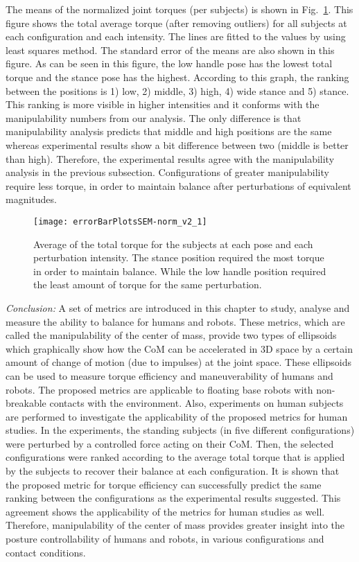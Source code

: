 The means of the normalized joint torques (per subjects) is shown in Fig.~\ref{jointtorque}. This figure shows the total average torque (after removing outliers) for all subjects at each configuration and each intensity. The lines are fitted to the values by using least squares method. The standard error of the means are also shown in this figure. As can be seen in this figure, the low handle pose has the lowest total torque and the stance pose has the highest. According to this graph, the ranking between the positions is 1) low, 2) middle, 3) high, 4) wide stance and 5) stance. This ranking is more visible in higher intensities and it conforms with the manipulability numbers from our analysis. The only difference is that manipulability analysis predicts that middle and high positions are the same whereas experimental results show a bit difference between two (middle is better than high). Therefore, the experimental results agree with the manipulability analysis in the previous subsection. Configurations of greater manipulability require less torque, in order to maintain balance after perturbations of equivalent magnitudes.
\begin{figure}
	\centering \texttt{[image: errorBarPlotsSEM-norm\_v2\_1]}
	\caption{Average of the total torque for the subjects at each pose and each perturbation intensity. The stance position required the most torque in order to maintain balance. While the low handle position required the least amount of torque for the same perturbation.}
	\label{jointtorque}
\end{figure}


\textit{Conclusion:} A set of metrics are introduced in this chapter to study, analyse and measure the ability to balance for humans and robots. These metrics, which are called the manipulability of the center of mass, provide two types of ellipsoids which graphically show how the CoM can be accelerated in 3D space by a certain amount of change of motion (due to impulses) at the joint space. These ellipsoids can be used to measure torque efficiency and maneuverability of humans and robots. The proposed metrics are applicable to floating base robots with non-breakable contacts with the environment. Also, experiments on human subjects are performed to investigate the applicability of the proposed metrics for human studies. In the experiments, the standing subjects (in five different configurations) were perturbed by a controlled force acting on their CoM. Then, the selected configurations were ranked according to the average total torque that is applied by the subjects to recover their balance at each configuration. It is shown that the proposed metric for torque efficiency can successfully predict the same ranking between the configurations as the experimental results suggested. This agreement shows the applicability of the metrics for human studies as well. Therefore, manipulability of the center of mass provides greater insight into the posture controllability of humans and robots, in various configurations and contact conditions.


